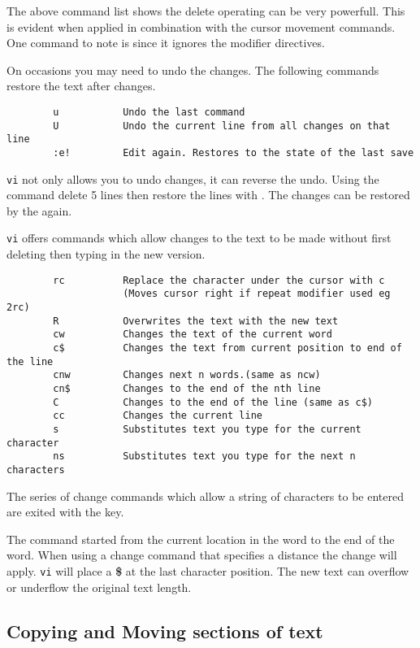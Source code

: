 The above command list shows the delete operating can be very powerfull.
This is evident when applied in combination with the cursor movement
commands. One command to note is  since it ignores the modifier
directives.

On occasions you may need to undo the changes. The following commands
restore the text after changes.
\begin{verbatim}
        u           Undo the last command
        U           Undo the current line from all changes on that line
        :e!         Edit again. Restores to the state of the last save
\end{verbatim}
{\tt vi} not only allows
you to undo changes, it can  reverse the undo. Using the command
\key{5dd} delete 5 lines then restore the lines with . The changes
can be restored by the  again.

{\tt vi} offers commands which allow changes to the text to be made
without first deleting then typing in the new version.
\begin{verbatim}
        rc          Replace the character under the cursor with c
                    (Moves cursor right if repeat modifier used eg 2rc)
        R           Overwrites the text with the new text
        cw          Changes the text of the current word
        c$          Changes the text from current position to end of the line
        cnw         Changes next n words.(same as ncw)
        cn$         Changes to the end of the nth line
        C           Changes to the end of the line (same as c$)
        cc          Changes the current line
        s           Substitutes text you type for the current character
        ns          Substitutes text you type for the next n characters
\end{verbatim}

The series of change commands which allow a string of characters to be
entered are exited with the key.

The  command started from the current location in the word to the
end of the word. When using a change command that specifies a distance 
the change will apply. {\tt vi} will place a {\bf \$} at the last character
position. The new text can overflow or underflow the original text length.

\subsection{Copying and Moving sections of text}

